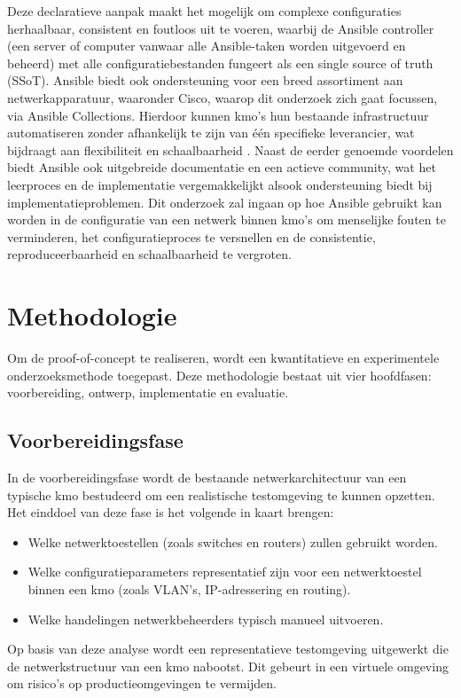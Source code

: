 Deze declaratieve aanpak maakt het mogelijk om complexe configuraties herhaalbaar, consistent en foutloos uit te voeren, waarbij de Ansible controller (een server of computer vanwaar alle Ansible-taken worden uitgevoerd en beheerd) met alle configuratiebestanden fungeert als een single source of truth (SSoT).
Ansible biedt ook ondersteuning voor een breed assortiment aan netwerkapparatuur, waaronder Cisco, waarop dit onderzoek zich gaat focussen, via Ansible Collections.
Hierdoor kunnen kmo's hun bestaande infrastructuur automatiseren zonder afhankelijk te zijn van één specifieke leverancier, wat bijdraagt aan flexibiliteit en schaalbaarheid \autocite{Cisco2022}.
Naast de eerder genoemde voordelen biedt Ansible ook uitgebreide documentatie en een actieve community, wat het leerproces en de implementatie vergemakkelijkt alsook ondersteuning biedt bij implementatieproblemen.
Dit onderzoek zal ingaan op hoe Ansible gebruikt kan worden in de configuratie van een netwerk binnen kmo's om menselijke fouten te verminderen, het configuratieproces te versnellen en de consistentie, reproduceerbaarheid en schaalbaarheid te vergroten.

\section{Methodologie}%
\label{sec:methodologie}

Om de proof-of-concept te realiseren, wordt een kwantitatieve en experimentele onderzoeksmethode toegepast. Deze methodologie bestaat uit vier hoofdfasen: voorbereiding, ontwerp, implementatie en evaluatie.

\subsection{Voorbereidingsfase}
In de voorbereidingsfase wordt de bestaande netwerkarchitectuur van een typische kmo bestudeerd om een realistische testomgeving te kunnen opzetten. Het einddoel van deze fase is het volgende in kaart brengen:
\begin{itemize}
  \item Welke netwerktoestellen (zoals switches en routers) zullen gebruikt worden.
  \item Welke configuratieparameters representatief zijn voor een netwerktoestel binnen een kmo (zoals VLAN's, IP-adressering en routing).
  \item Welke handelingen netwerkbeheerders typisch manueel uitvoeren.
\end{itemize}
Op basis van deze analyse wordt een representatieve testomgeving uitgewerkt die de netwerkstructuur van een kmo nabootst. Dit gebeurt in een virtuele omgeving om risico's op productieomgevingen te vermijden.

